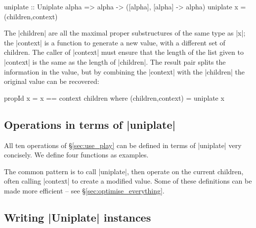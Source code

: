 \begin{code}
uniplate :: Uniplate alpha => alpha -> ([alpha], [alpha] -> alpha)
uniplate x = (children,context)
\end{code}

The |children| are all the maximal proper substructures of the same type as |x|; the |context| is a function to generate a new value, with a different set of children. The caller of |context| must ensure that the length of the list given to |context| is the same as the length of |children|. The result pair splits the information in the value, but by combining the |context| with the |children| the original value can be recovered:

\begin{code}
propId x = x == context children
    where (children,context) = uniplate x
\end{code}

\subsection{Operations in terms of |uniplate|}
\label{sec:using_replacechildren}

All ten operations of \S\ref{sec:use_play} can be defined in terms of |uniplate| very concisely. We define four functions as examples.


The common pattern is to call |uniplate|, then operate on the current children, often calling |context| to create a modified value. Some of these definitions can be made more efficient -- see \S\ref{sec:optimise_everything}.

\subsection{Writing |Uniplate| instances}
\label{sec:play_instances}

